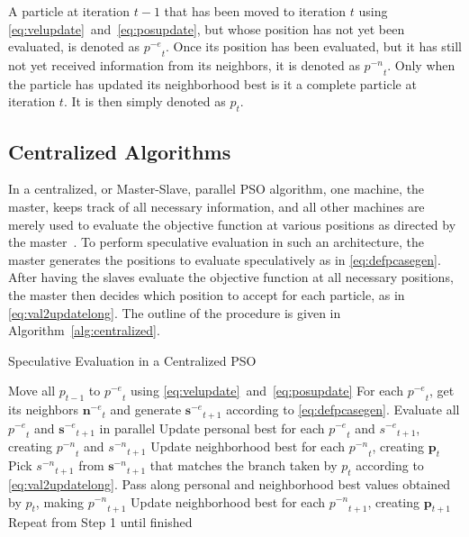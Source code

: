 \documentclass[journal,letterpaper]{IEEEtran}
\newcommand{\alg}[1]{Algorithm~\ref{alg:#1}}
\providecommand{\noeval}[1]{\ensuremath{#1^{-e}}}
\providecommand{\nonbest}[1]{\ensuremath{#1^{-n}}}
\providecommand{\p}{\ensuremath{p}}
\providecommand{\pset}{\ensuremath{\mathbf{p}}}
\providecommand{\s}{\ensuremath{s}}
\providecommand{\sset}{\ensuremath{\mathbf{s}}}
\providecommand{\nset}{\ensuremath{\mathbf{n}}}
\begin{document}
A particle at iteration $t-1$ that has been moved to iteration $t$ using
\eqref{eq:velupdate}~and~\eqref{eq:posupdate}, but whose position has
not yet been evaluated, is denoted as $\noeval{\p}_t$.  Once its position has
been evaluated, but it has still not yet received information from its
neighbors, it is denoted as $\nonbest{\p}_t$.  Only when the particle has
updated its neighborhood best is it a complete particle at iteration $t$.  It
is then simply denoted as $\p_t$.

\subsection{Centralized Algorithms}

In a centralized, or Master-Slave, parallel PSO algorithm, one machine, the
master, keeps track of all necessary information, and all other machines are
merely used to evaluate the objective function at various positions as directed
by the master~\cite{belal-2004-parallel-models-for-pso}.  To perform
speculative evaluation in such an architecture, the master generates the
positions to evaluate speculatively as in \eqref{eq:defpcasegen}.  After having
the slaves evaluate the objective function at all necessary positions, the
master then decides which position to accept for each particle, as in
\eqref{eq:val2updatelong}.  The outline of the procedure is given in
\alg{centralized}.

\begin{algorithm}
  \caption{Speculative Evaluation in a Centralized PSO}
  \label{alg:centralized}
  \begin{algorithmic}[1]
	\STATE Move all $\p_{t-1}$ to $\noeval{\p}_t$ using
	  \eqref{eq:velupdate}~and~\eqref{eq:posupdate}
	\STATE For each $\noeval{\p}_t$, get its neighbors $\noeval{\nset}_t$ and
	  generate $\noeval{\sset}_{t+1}$ according to
	  \eqref{eq:defpcasegen}.
	\STATE Evaluate all $\noeval{\p}_t$ and $\noeval{\sset}_{t+1}$ in parallel
	\STATE Update personal best for each $\noeval{\p}_t$ and
	  $\noeval{\s}_{t+1}$, creating $\nonbest{\p}_t$ and $\nonbest{\s}_{t+1}$
	\STATE Update neighborhood best for each $\nonbest{\p}_t$, creating
	  $\pset_t$
	\FORALL{$\p_t$}
	\STATE Pick $\nonbest{\s}_{t+1}$ from $\nonbest{\sset}_{t+1}$ that matches
	  the branch taken by $\p_t$ according to
	  \eqref{eq:val2updatelong}.
	\STATE Pass along personal and neighborhood best values obtained by $\p_t$,
	  making $\nonbest{\p}_{t+1}$
	\ENDFOR
	\STATE Update neighborhood best for each $\nonbest{\p}_{t+1}$, creating
	  $\pset_{t+1}$
	\STATE Repeat from Step 1 until finished
  \end{algorithmic}
\end{algorithm}
\end{document}
